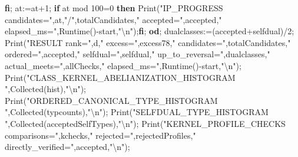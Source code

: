\documentclass[
  10pt,
  letterpaper,
]{article}
\newenvironment{Shaded}{}{}
\newcommand{\BuiltInTok}[1]{\textcolor[rgb]{0.00,0.50,0.00}{#1}}
\newcommand{\ControlFlowTok}[1]{\textcolor[rgb]{0.00,0.44,0.13}{\textbf{#1}}}
\newcommand{\FloatTok}[1]{\textcolor[rgb]{0.25,0.63,0.44}{#1}}
\newcommand{\NormalTok}[1]{#1}
\newcommand{\OperatorTok}[1]{\textcolor[rgb]{0.40,0.40,0.40}{#1}}
\newcommand{\OtherTok}[1]{\textcolor[rgb]{0.00,0.44,0.13}{#1}}
\newcommand{\StringTok}[1]{\textcolor[rgb]{0.25,0.44,0.63}{#1}}
\newcommand{\VariableTok}[1]{\textcolor[rgb]{0.10,0.09,0.49}{#1}}
\begin{document}
\begin{Shaded}
\begin{Highlighting}[]
  \ControlFlowTok{fi}\OperatorTok{;}
  \VariableTok{at}\OperatorTok{:=}\VariableTok{at}\OperatorTok{+}\FloatTok{1}\OperatorTok{;}
  \ControlFlowTok{if} \VariableTok{at} \OtherTok{mod} \FloatTok{100}\OperatorTok{=}\FloatTok{0} \ControlFlowTok{then} \BuiltInTok{Print}\NormalTok{(}\StringTok{"IP\_PROGRESS candidates="}\OperatorTok{,}\VariableTok{at}\OperatorTok{,}\StringTok{"/"}\OperatorTok{,}\VariableTok{totalCandidates}\OperatorTok{,}\StringTok{" accepted="}\OperatorTok{,}\VariableTok{accepted}\OperatorTok{,}\StringTok{" elapsed\_ms="}\OperatorTok{,}\BuiltInTok{Runtime}\NormalTok{()}\OperatorTok{{-}}\VariableTok{start}\OperatorTok{,}\StringTok{"\textbackslash{}n"}\NormalTok{)}\OperatorTok{;}\ControlFlowTok{fi}\OperatorTok{;}
 \ControlFlowTok{od}\OperatorTok{;}
 \VariableTok{dualclasses}\OperatorTok{:=}\NormalTok{(}\VariableTok{accepted}\OperatorTok{+}\VariableTok{selfdual}\NormalTok{)}\OperatorTok{/}\FloatTok{2}\OperatorTok{;}
 \BuiltInTok{Print}\NormalTok{(}\StringTok{"RESULT rank="}\OperatorTok{,}\VariableTok{d}\OperatorTok{,}\StringTok{" excess="}\OperatorTok{,}\VariableTok{excess78}\OperatorTok{,}\StringTok{" candidates="}\OperatorTok{,}\VariableTok{totalCandidates}\OperatorTok{,}\StringTok{" ordered="}\OperatorTok{,}\VariableTok{accepted}\OperatorTok{,}\StringTok{" selfdual="}\OperatorTok{,}\VariableTok{selfdual}\OperatorTok{,}\StringTok{" up\_to\_reversal="}\OperatorTok{,}\VariableTok{dualclasses}\OperatorTok{,}\StringTok{" actual\_meets="}\OperatorTok{,}\VariableTok{allChecks}\OperatorTok{,}\StringTok{" elapsed\_ms="}\OperatorTok{,}\BuiltInTok{Runtime}\NormalTok{()}\OperatorTok{{-}}\VariableTok{start}\OperatorTok{,}\StringTok{"\textbackslash{}n"}\NormalTok{)}\OperatorTok{;}
 \BuiltInTok{Print}\NormalTok{(}\StringTok{"CLASS\_KERNEL\_ABELIANIZATION\_HISTOGRAM "}\OperatorTok{,}\BuiltInTok{Collected}\NormalTok{(}\VariableTok{hist}\NormalTok{)}\OperatorTok{,}\StringTok{"\textbackslash{}n"}\NormalTok{)}\OperatorTok{;}
 \BuiltInTok{Print}\NormalTok{(}\StringTok{"ORDERED\_CANONICAL\_TYPE\_HISTOGRAM "}\OperatorTok{,}\BuiltInTok{Collected}\NormalTok{(}\VariableTok{typcounts}\NormalTok{)}\OperatorTok{,}\StringTok{"\textbackslash{}n"}\NormalTok{)}\OperatorTok{;}
 \BuiltInTok{Print}\NormalTok{(}\StringTok{"SELFDUAL\_TYPE\_HISTOGRAM "}\OperatorTok{,}\BuiltInTok{Collected}\NormalTok{(}\VariableTok{acceptedSelfTypes}\NormalTok{)}\OperatorTok{,}\StringTok{"\textbackslash{}n"}\NormalTok{)}\OperatorTok{;}
 \BuiltInTok{Print}\NormalTok{(}\StringTok{"KERNEL\_PROFILE\_CHECKS comparisons="}\OperatorTok{,}\VariableTok{kchecks}\OperatorTok{,}\StringTok{" rejected="}\OperatorTok{,}\VariableTok{rejectedProfiles}\OperatorTok{,}\StringTok{" directly\_verified="}\OperatorTok{,}\VariableTok{accepted}\OperatorTok{,}\StringTok{"\textbackslash{}n"}\NormalTok{)}\OperatorTok{;}

\end{Highlighting}
\end{Shaded}
\end{document}
